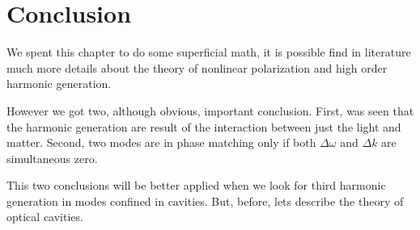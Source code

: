 \section{Conclusion}
We spent this chapter to do some superficial math, it is possible find in literature much more details about the theory of nonlinear polarization and high order harmonic generation. 

However we got two, although obvious, important conclusion. First, was seen that the harmonic generation are result of the interaction between just the light and matter. Second, two modes are in phase matching only if both $\Delta \omega$ and $\Delta k$ are simultaneous zero.

This two conclusions will be better applied when we look for third harmonic generation in  modes confined in cavities. But, before, lets describe the theory of optical cavities.  